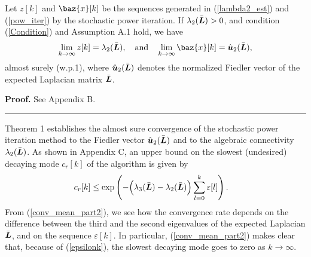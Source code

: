 \documentclass[10pt,twocolumn]{IEEEtran}
\def\bL{\mbox{\boldmath $L$}}
\def\bu{\mbox{\boldmath $u$}}
\def\bx{\baz{x}}
\newenvironment{proof}[1][Proof]{\noindent \textbf{#1.} }{\qedsymbol}
\newcommand{\qedsymbol}{\hspace{\fill}\rule{1.5ex}{1.5ex}}
\begin{document}
 Let $z[k]$ and $\bx[k]$ be the sequences generated in (\ref{lambda2_est}) and (\ref{pow_iter}) by the stochastic power iteration. If $\lambda_{2}(\bar{\bL})>0$, and condition (\ref{Condition}) and Assumption A.1 hold, we have
\begin{align}
\lim_{k\rightarrow\infty} z[k]=\lambda_{2}(\bar{\bL}), \quad\hbox{and}\quad \lim_{k\rightarrow\infty} \bx[k]=\hat{\bu}_{2}(\bar{\bL}),
\end{align}
almost surely (w.p.1), where $\hat{\bu}_{2}(\bar{\bL})$ denotes the normalized Fiedler vector of the expected Laplacian matrix $\bar{\bL}$.

\begin{proof}
See Appendix B.
\end{proof}


Theorem 1 establishes the almost sure convergence of the stochastic power iteration method to the Fiedler vector $\hat{\bu}_{2}(\bar{\bL})$ and to the algebraic connectivity $\lambda_2(\bar{\bL})$. As shown in Appendix C, an upper bound on the slowest (undesired) decaying mode $c_r[k]$ of the algorithm is given by
\begin{align}\label{conv_mean_part2}
c_r[k]&\leq \exp \left(-\Big(\lambda_3(\bar{\bL})-\lambda_2(\bar{\bL})\Big)\sum_{l=0}^k\varepsilon[l]\right).
\end{align}
From (\ref{conv_mean_part2}), we see how the convergence rate depends on the difference between the third and the second eigenvalues of the expected Laplacian $\bar{\bL}$, and on the sequence $\varepsilon[k]$. In particular, (\ref{conv_mean_part2}) makes clear that, because of (\ref{epsilonk}), the slowest decaying mode goes to zero as $k\rightarrow\infty$.
\end{document}
